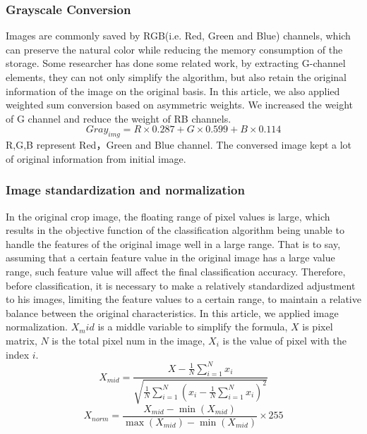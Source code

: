 \documentclass[11pt,en]{elegantpaper}
\begin{document}
\subsubsection{Grayscale Conversion}
Images are commonly saved by RGB(i.e. Red, Green and Blue) channels, which can preserve the natural color while reducing the memory consumption of the storage. Some researcher has done some related work\cite{sun2013rgb}, by extracting G-channel elements, they can not only simplify the algorithm, but also retain the original information of the image on the original basis. In this article, we also applied weighted sum conversion based on asymmetric weights. We increased the weight of G channel and reduce the weight of RB channels. 
$$Gray_{img}=R\times 0.287+G\times 0.599 + B\times 0.114$$
R,G,B represent Red，Green and Blue channel. The conversed image kept a lot of original information from initial image.

\subsubsection{Image standardization and normalization}
In the original crop image, the floating range of pixel values ​​is large, which results in the objective function of the classification algorithm being unable to handle the features of the original image well in a large range. That is to say, assuming that a certain feature value in the original image has a large value range, such feature value will affect the final classification accuracy. Therefore, before classification, it is necessary to make a relatively standardized adjustment to his images, limiting the feature values ​​to a certain range, to maintain a relative balance between the original characteristics. In this article, we applied image normalization. $X_mid$ is a middle variable to simplify the formula, $X$ is pixel matrix, $N$ is the total pixel num in the image, $X_i$ is the value of pixel with the index $i$.
$$X_{mid}=\frac{X-\frac{1}{N} \sum_{i=1}^{N} x_{i}}{\sqrt{\frac{1}{N} \sum_{i=1}^{N}\left(x_{i}-\frac{1}{N} \sum_{i=1}^{N} x_{i}\right)^{2}}}$$ 
$$X_{norm}=\frac{X_{mid}-\min \left(X_{mid}\right)}{\max \left(X_{mid}\right)-\min \left(X_{mid}\right)} \times 255$$
\end{document}
